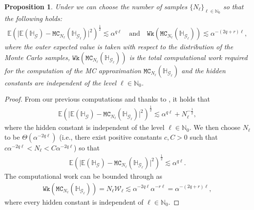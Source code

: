 \documentclass{article}
\newtheorem{proposition}[theorem]{Proposition}
\newcommand{\cG}{\mathcal{G}}
\newcommand{\cW}{\mathcal{W}}
\newcommand{\IE}{\mathbb{E}}
\newcommand{\IH}{\mathbb{H}}
\newcommand{\IN}{\mathbb{N}}
\newcommand{\mc}[2]{\mathtt{MC}_{#1}{\left(#2\right)}}
\newcommand{\work}[1]{\mathtt{Wk}\!\left(#1\right)}
\theoremstyle{definition}
\begin{document}
\begin{proposition}
  \label{prop:MCRate}
  Under  we can choose the number of samples $\{N_\ell\}_{\ell\in\IN_0}$ so that
  the following holds:
  \begin{align*}
    \IE\left(\vert{\IE(\IH_{\cG})-\mc{N_\ell}{\IH_{\cG_\ell}}}\vert^2\right)^{\frac{1}{2}}\lesssim\alpha^{q\ell}
    \quad\text{and}\quad
    \work{\mc{N_\ell}{\IH_{\cG_\ell}}}\lesssim \alpha^{-(2q+r)\ell},
  \end{align*}
  where the outer expected value is taken with respect to the distribution of the Monte Carlo samples,
  $\work{\mc{N_\ell}{\IH_{\cG_\ell}}}$ is the total computational work required for the computation of the
  MC approximation $\mc{N_\ell}{\IH_{\cG_\ell}}$ and the hidden constants are independent of the level $\ell\in\IN_0$.
\end{proposition}
\begin{proof}
  From our previous computations and thanks to , it holds that
  \begin{align*}
    \IE\left(\vert{\IE(\IH_{\cG})-\mc{N_\ell}{\IH_{\cG_\ell}}}\vert^2\right)^{\frac{1}{2}}
    \lesssim \alpha^{q\ell}+N_\ell^{-\frac{1}{2}},
  \end{align*}
  where the hidden constant is independent of the level $\ell\in\IN_0$.
  We then choose $N_\ell$ to be $\Theta(\alpha^{-2q\ell})$
  (i.e., there exist positive constants $c,C>0$ such that $c\alpha^{-2q\ell} < N_\ell < C\alpha^{-2q\ell}$)
  so that
  \begin{align*}
    \IE\left(\vert{\IE(\IH_{\cG})-\mc{N_\ell}{\IH_{\cG_\ell}}}\vert^2\right)^{\frac{1}{2}}
    \lesssim \alpha^{q\ell}.
\end{align*}
  The computational work can be bounded through  as
  \begin{align*}
    \work{\mc{N_\ell}{\IH_{\cG_\ell}}} = N_\ell\cW_\ell\lesssim \alpha^{-2q\ell}\alpha^{-r\ell} = \alpha^{-(2q+r)\ell},
  \end{align*}
  where every hidden constant is independent of $\ell\in\IN_0$.
\end{proof}
\end{document}
